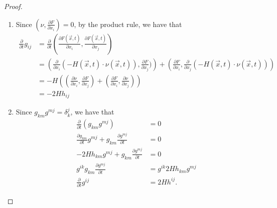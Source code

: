 \begin{proof}
	\begin{enumerate}
		\item Since $\left( \nu ,\frac{\partial F}{\partial x_{i}}  \right) =0$, by the product rule, we have that
		      \begin{equation*}
			      \begin{split}
				      \frac{\partial }{\partial t} g_{ij}^{}
				      & = \frac{\partial }{\partial t} \left( \frac{\partial F(\vec{x},t) }{\partial x_{i}} , \frac{\partial F(\vec{x},t) }{\partial x_{j }}  \right)                                                                                                               \\
				      & = \left( \frac{\partial }{\partial x_{i}} (-H (\vec{x},t) \cdot \nu (\vec{x},t)) , \frac{\partial F}{\partial x_{j}} ) \right) + \left( \frac{\partial F}{\partial x_{i}}, \frac{\partial }{\partial x_{j}} (-H (\vec{x},t) \cdot \nu (\vec{x},t))  \right) \\
				      & = -H(\left( \frac{\partial \nu }{\partial x_{i}} , \frac{\partial F}{\partial x_{j}}  \right) + \left( \frac{\partial F}{\partial x_{i}} , \frac{\partial \nu }{\partial x_{j}}  \right) )                                                                  \\
				      & = -2H h_{ij}^{}
			      \end{split}
		      \end{equation*}
		\item Since $g_{km}^{} g_{}^{mj} = \delta_{k}^{j} $, we have that
		      \begin{align*}
			      \frac{\partial }{\partial t} (g_{km}^{} g_{}^{mj})                                                  & =0                                \\
			      \frac{\partial g_{km}^{} }{\partial t} g_{}^{mj} + g_{km}^{} \frac{\partial g_{}^{mj} }{\partial t} & =0                                \\
			      -2H h_{km}^{} g_{}^{mj} + g_{km}^{} \frac{\partial g_{}^{mj} }{\partial t}                          & =0                                \\
			      g_{}^{ik} g_{km}^{} \frac{\partial g_{}^{mj} }{\partial t}                                          & =g_{}^{ik} 2H h_{km}^{} g_{}^{mj} \\
			      \frac{\partial }{\partial t} g_{}^{ij}                                                              & = 2H h_{}^{ij}.
		      \end{align*}

\end{enumerate}
\end{proof}
